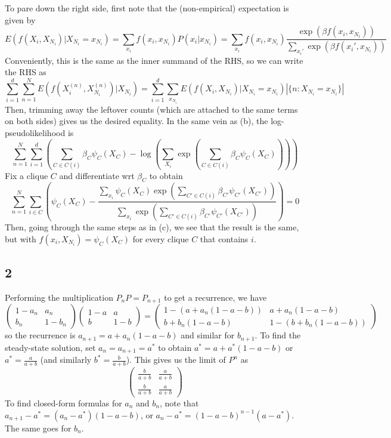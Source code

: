 \documentclass{article}
\newcommand{\openm}{\begin{pmatrix}}
\newcommand{\closem}{\end{pmatrix}}
\begin{document}
To pare down the right side, first note that the (non-empirical) expectation is given by
\[E(f(X_i,X_{N_i})|X_{N_i}=x_{N_i})=\sum_{x_i}f(x_i,x_{N_i})P(x_i|x_{N_i})=\sum_{x_i}f(x_i, x_{N_i})\frac{\exp\left(\beta f(x_i,x_{N_i})\right)}{\sum_{x_i'}\exp\left(\beta f(x_i',x_{N_i})\right)}\]
Conveniently, this is the same as the inner summand of the RHS, so we can write the RHS as
\[\sum_{i=1}^d\sum_{n=1}^NE(f(X_i^{(n)},X_{N_i}^{(n)})|X_{N_i})=\sum_{i=1}^d\sum_{x_{N_i}}E(f(X_i,X_{N_i})|X_{N_i}=x_{N_i})\left|\{n:X_{N_i}=x_{N_i}\}\right|\]
Then, trimming away the leftover counts (which are attached to the same terms on both sides) gives us the desired equality.
In the same vein as (b), the log-pseudolikelihood is
\[\sum_{n=1}^N\sum_{i=1}^d\left(\sum_{C\in C(i)}\beta_C\psi_{C}(X_{C})-\log\left(\sum_{X_i}\exp\left(\sum_{C\in C(i)}\beta_C\psi_C(X_C)\right)\right)\right)\]
Fix a clique $C$ and differentiate wrt $\beta_C$ to obtain
\[\sum_{n=1}^N\sum_{i\in C}\left(\psi_C(X_C)-\frac{\sum_{x_i}\psi_C(X_C)\exp\left(\sum_{C'\in C(i)}\beta_{C'}\psi_{C'}(X_{C'})\right)}{\sum_{x_i}\exp\left(\sum_{C'\in C(i)}\beta_{C'}\psi_{C'}(X_{C'})\right)}\right)=0\]
Then, going through the same steps as in (c), we see that the result is the same, but with $f(x_i,X_{N_i})=\psi_C(X_C)$ for every clique $C$ that contains $i$.
\subsection*{2}
Performing the multiplication $P_nP=P_{n+1}$ to get a recurrence, we have
\[\openm1-a_n&a_n\\b_n&1-b_n\closem\openm1-a&a\\b&1-b\closem=\openm1-(a+a_n(1-a-b))&a+a_n(1-a-b)\\b+b_n(1-a-b)&1-(b+b_n(1-a-b))\closem\]
so the recurrence is $a_{n+1}=a+a_n(1-a-b)$ and similar for $b_{n+1}$. To find the steady-state solution, set $a_n=a_{n+1}=a^*$ to obtain $a^*=a+a^*(1-a-b)$ or $a^*=\frac{a}{a+b}$ (and similarly $b^*=\frac{b}{a+b}$). This gives us the limit of $P^n$ as 
\[\openm\frac{b}{a+b}&\frac{a}{a+b}\\\frac{b}{a+b}&\frac{a}{a+b}\closem\]
To find closed-form formulas for $a_n$ and $b_n$, note that $a_{n+1}-a^*=(a_n-a^*)(1-a-b)$, or $a_n-a^*=(1-a-b)^{n-1}(a-a^*)$. The same goes for $b_n$.
\end{document}
